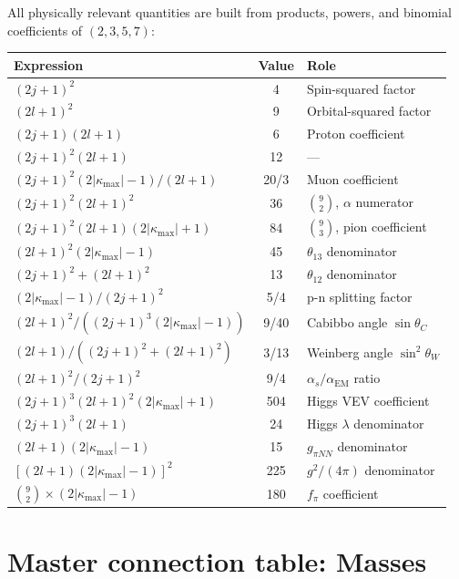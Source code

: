 \documentclass[11pt,letterpaper]{article}
\numberwithin{equation}{section}
\begin{document}
All physically relevant quantities are built from products, powers, and
binomial coefficients of $(2, 3, 5, 7)$:

\begin{center}
\begin{tabular}{lcl}
\toprule
Expression & Value & Role \\
\midrule
$(2j+1)^2$ & 4 & Spin-squared factor \\
$(2l+1)^2$ & 9 & Orbital-squared factor \\
$(2j+1)(2l+1)$ & 6 & Proton coefficient \\
$(2j+1)^2(2l+1)$ & 12 & --- \\
$(2j+1)^2(2|\kappa_\mathrm{max}|-1)/(2l+1)$ & 20/3 & Muon coefficient \\
$(2j+1)^2(2l+1)^2$ & 36 & $\binom{9}{2}$, $\alpha$ numerator \\
$(2j+1)^2(2l+1)(2|\kappa_\mathrm{max}|+1)$ & 84 & $\binom{9}{3}$, pion coefficient \\
$(2l+1)^2(2|\kappa_\mathrm{max}|-1)$ & 45 & $\theta_{13}$ denominator \\
$(2j+1)^2 + (2l+1)^2$ & 13 & $\theta_{12}$ denominator \\
$(2|\kappa_\mathrm{max}|-1)/(2j+1)^2$ & 5/4 & p-n splitting factor \\
$(2l+1)^2/((2j+1)^3(2|\kappa_\mathrm{max}|-1))$ & 9/40 & Cabibbo angle $\sin\theta_C$ \\
$(2l+1)/((2j+1)^2+(2l+1)^2)$ & 3/13 & Weinberg angle $\sin^2\theta_W$ \\
$(2l+1)^2/(2j+1)^2$ & 9/4 & $\alpha_s/\alpha_\mathrm{EM}$ ratio \\
$(2j+1)^3(2l+1)^2(2|\kappa_\mathrm{max}|+1)$ & 504 & Higgs VEV coefficient \\
$(2j+1)^3(2l+1)$ & 24 & Higgs $\lambda$ denominator \\
$(2l+1)(2|\kappa_\mathrm{max}|-1)$ & 15 & $g_{\pi NN}$ denominator \\
$[(2l+1)(2|\kappa_\mathrm{max}|-1)]^2$ & 225 & $g^2/(4\pi)$ denominator \\
$\binom{9}{2} \times (2|\kappa_\mathrm{max}|-1)$ & 180 & $f_\pi$ coefficient \\
\bottomrule
\end{tabular}
\end{center}

\section{Master connection table: Masses}
\label{sec:masses}
\end{document}
